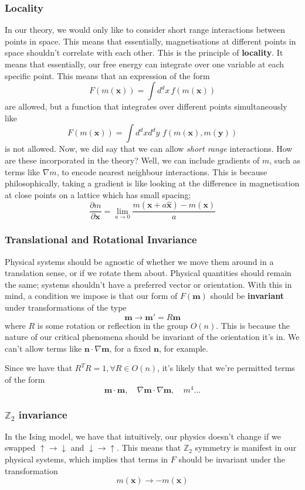 \documentclass[11pt, oneside]{article}   	%
\newcommand{\ve}[1]{ \mathbf{#1} }
\newcommand{\spint}{ \int d^d x \, }
\newcommand{\pdif}[2] { \frac{ \partial #1 }{ \partial #2 } }
\begin{document}
\subsubsection*{Locality} 
In our theory, we would only like to consider short range interactions between points in space. This means that essentially, magnetisations at different points in space shouldn't correlate with each other. This is the principle of \textbf{locality}. It means that essentially, our free energy can integrate over one variable at each specific point. This means that an expression of the form 
\[ 
F ( m ( \ve{x})) = \spint   f( m ( \ve{ x} )) 
\] are  allowed, but a function that integrates over different points simultaneously like 
\[ 
F( m ( \ve{x}) ) = \int d^d x d^d y  \, \, f ( m ( \ve{ x} ), m ( \ve{ y} ) ) 
\] is not allowed. Now, we did say that we can allow \textit{short range} interactions. How are these incorporated in the theory? Well, we can include gradients of $m  $, such as terms like $ \nabla m$, to encode nearest neighbour interactions. This is because philosophically, taking a gradient is like looking at the difference in magnetisation at close points on a lattice which has small spacing; 
\[ 
\pdif{ m }{ \ve{ x} }  = \lim_{ a \rightarrow 0 } \frac{ m ( \ve{ x} + a \hat{ \ve { x} })  - m ( \ve{ x} )  }{ a } 
\] 

\subsubsection*{Translational and Rotational Invariance} 
Physical systems should be agnostic of whether we move them around in a translation sense, or if we rotate them about. Physical quantities should remain the same; systems shouldn't have a preferred vector or orientation. With this in mind, a condition we impose is that our form of $F(\mathbf{m})$ should be \textbf{invariant} under transformations of the type 
\[
\mathbf{m} \rightarrow \mathbf{m}' = R \mathbf{m} 
\] where $R$ is some rotation or reflection in the group $O(n)$. This is because the nature of our critical phenomena should be invariant of the orientation it's in. We can't allow terms like $ \ve{ n} \cdot \nabla \ve{ m } $, for a fixed $\ve{ n} $, for example. 

Since we have that $R^T R = 1, \forall R \in O(n)$, it's likely that we're permitted terms of the form 
\[
\mathbf{m} \cdot \mathbf{m}, \quad \nabla \mathbf{m} \cdot \nabla \mathbf{m}, \quad m^4 \dots 
\]

\subsubsection*{$\mathbb{ Z}_2 $ invariance}
In the Ising model, we have that intuitively, our physics doesn't change if we swapped $\uparrow \rightarrow \downarrow$ and $\downarrow \rightarrow \uparrow$. This means that $\mathbb{ Z}_2 $ symmetry is manifest in our physical systems, which implies that terms in $F$ should be invariant under the transformation 
\[ 
m ( \ve{ x} ) \rightarrow  - m( \ve{   x} ) 
\]
\end{document}
